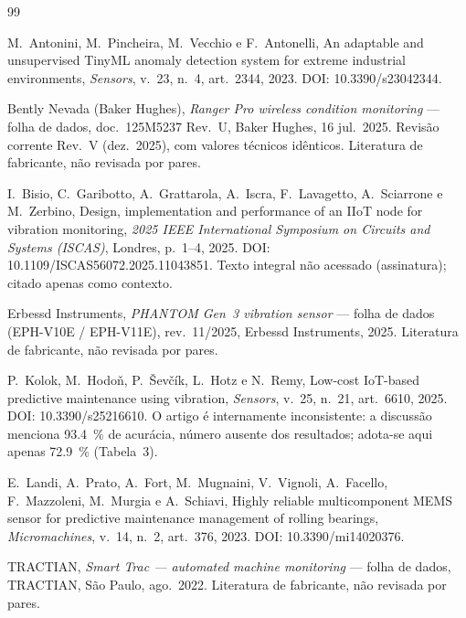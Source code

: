 \documentclass[10pt,a4paper,landscape,twocolumn]{article}
\begin{document}
\footnotesize
\begin{thebibliography}{99}
\setlength{\itemsep}{2pt}

M.~Antonini, M.~Pincheira, M.~Vecchio e F.~Antonelli,
\newblock An adaptable and unsupervised TinyML anomaly detection system for extreme industrial environments,
\newblock \emph{Sensors}, v.~23, n.~4, art.~2344, 2023.
\newblock DOI: 10.3390/s23042344.

Bently Nevada (Baker Hughes),
\newblock \emph{Ranger Pro wireless condition monitoring} --- folha de dados, doc.\ 125M5237 Rev.~U,
\newblock Baker Hughes, 16 jul.\ 2025. Revisão corrente Rev.~V (dez.\ 2025), com valores técnicos idênticos.
\newblock Literatura de fabricante, não revisada por pares.

I.~Bisio, C.~Garibotto, A.~Grattarola, A.~Iscra, F.~Lavagetto, A.~Sciarrone e M.~Zerbino,
\newblock Design, implementation and performance of an IIoT node for vibration monitoring,
\newblock \emph{2025 IEEE International Symposium on Circuits and Systems (ISCAS)}, Londres, p.~1--4, 2025.
\newblock DOI: 10.1109/ISCAS56072.2025.11043851.
\newblock Texto integral não acessado (assinatura); citado apenas como contexto.

Erbessd Instruments,
\newblock \emph{PHANTOM Gen~3 vibration sensor} --- folha de dados (EPH-V10E / EPH-V11E), rev.\ 11/2025,
\newblock Erbessd Instruments, 2025.
\newblock Literatura de fabricante, não revisada por pares.

P.~Kolok, M.~Hodoň, P.~Ševčík, L.~Hotz e N.~Remy,
\newblock Low-cost IoT-based predictive maintenance using vibration,
\newblock \emph{Sensors}, v.~25, n.~21, art.~6610, 2025.
\newblock DOI: 10.3390/s25216610.
\newblock O artigo é internamente inconsistente: a discussão menciona \SI{93,4}{\percent} de acurácia, número ausente dos resultados; adota-se aqui apenas \SI{72,9}{\percent} (Tabela~3).

E.~Landi, A.~Prato, A.~Fort, M.~Mugnaini, V.~Vignoli, A.~Facello, F.~Mazzoleni, M.~Murgia e A.~Schiavi,
\newblock Highly reliable multicomponent MEMS sensor for predictive maintenance management of rolling bearings,
\newblock \emph{Micromachines}, v.~14, n.~2, art.~376, 2023.
\newblock DOI: 10.3390/mi14020376.

TRACTIAN,
\newblock \emph{Smart Trac --- automated machine monitoring} --- folha de dados,
\newblock TRACTIAN, São Paulo, ago.\ 2022.
\newblock Literatura de fabricante, não revisada por pares.

\end{thebibliography}
\end{document}
